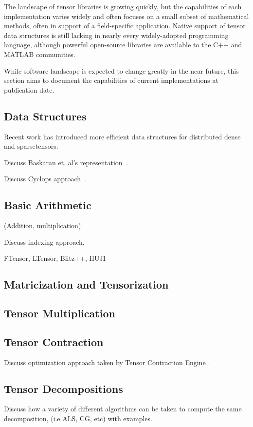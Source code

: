 \documentclass[10pt]{article}
\begin{document}
The landscape of tensor libraries is growing quickly, but the capabilities of each implementation varies widely and often focuses on a small subset of mathematical methods, often in support of a field-specific application. Native support of tensor data structures is still lacking in nearly every widely-adopted programming language, although powerful open-source libraries are available to the C++ and MATLAB communities. 

While software landscape is expected to change greatly in the near future, this section aims to document the capabilities of current implementations at  publication date.

\subsection{Data Structures}
Recent work has introduced more efficient data structures for distributed dense and sparsetensors.

Discuss Baskaran et. al's representation~\cite{6408676}.

Discuss Cyclops approach~\cite{CTF}.

\subsection{Basic Arithmetic}
(Addition, multiplication)

Discuss indexing approach.

FTensor, LTensor, Blitz++, HUJI

\subsection{Matricization and Tensorization}

\subsection{Tensor Multiplication}

\subsection{Tensor Contraction}
Discuss optimization approach taken by Tensor Contraction Engine~\cite{TCE}.

\subsection{Tensor Decompositions}
Discuss how a variety of different algorithms can be taken to compute the same decomposition, (i.e ALS, CG, etc) with examples.
\end{document}
